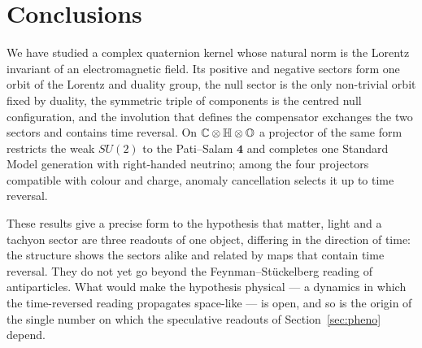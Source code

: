 \section{Conclusions}\label{sec:conclusions}

We have studied a complex quaternion kernel whose natural norm is the Lorentz invariant of an electromagnetic field.  Its positive and
negative sectors form one orbit of the Lorentz and duality group, the null sector is the only non-trivial orbit fixed by duality, the
symmetric triple of components is the centred null configuration, and the involution that defines the compensator exchanges the two sectors
and contains time reversal.  On \(\mathbb C\otimes\mathbb H\otimes\mathbb O\) a projector of the same form restricts the weak \(SU(2)\) to the Pati--Salam
\(\mathbf4\) and completes one Standard Model generation with right-handed neutrino; among the four projectors compatible with colour and charge,
anomaly cancellation selects it up to time reversal.

These results give a precise form to the hypothesis that matter, light and a tachyon sector are three readouts of one object, differing in
the direction of time: the structure shows the sectors alike and related by maps that contain time reversal.  They do not yet go beyond the
Feynman--St\"uckelberg reading of antiparticles.  What would make the hypothesis physical --- a dynamics in which the time-reversed reading
propagates space-like --- is open, and so is the origin of the single number on which the speculative readouts of Section~\ref{sec:pheno} depend.
